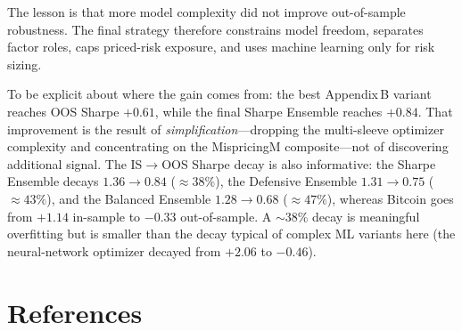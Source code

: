 \documentclass[11pt,a4paper]{article}
\begin{document}
The lesson is that more model complexity did not improve out-of-sample robustness. The final strategy therefore constrains model freedom, separates factor roles, caps priced-risk exposure, and uses machine learning only for risk sizing.

To be explicit about where the gain comes from: the best Appendix\,B variant reaches OOS Sharpe $+0.61$, while the final Sharpe Ensemble reaches $+0.84$. That improvement is the result of \emph{simplification}---dropping the multi-sleeve optimizer complexity and concentrating on the MispricingM composite---not of discovering additional signal. The IS$\to$OOS Sharpe decay is also informative: the Sharpe Ensemble decays $1.36 \to 0.84$ (${\approx}38\%$), the Defensive Ensemble $1.31 \to 0.75$ (${\approx}43\%$), and the Balanced Ensemble $1.28 \to 0.68$ (${\approx}47\%$), whereas Bitcoin goes from $+1.14$ in-sample to $-0.33$ out-of-sample. A ${\sim}38\%$ decay is meaningful overfitting but is smaller than the decay typical of complex ML variants here (the neural-network optimizer decayed from $+2.06$ to $-0.46$).

\section*{References}
\end{document}
